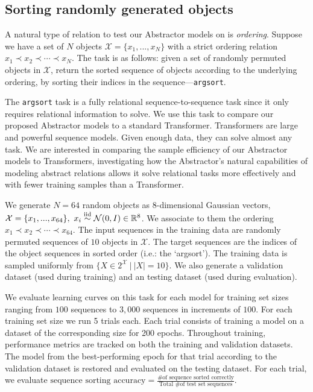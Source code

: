 \subsection{Sorting randomly generated objects}
\label{ssec:random_object_argsort}
\def\subtask#1{\noindent{\it\bfseries #1.}}


A natural type of relation to test our Abstractor models on is \textit{ordering}. Suppose we have a set of $N$ objects $\mathcal{X} = \{ x_1 , ..., x_N \}$ with a strict ordering relation $x_1 \prec x_2 \prec \cdots \prec x_N$. The task is as follows: given a set of randomly permuted objects in $\mathcal{X}$, return the sorted sequence of objects according to the underlying ordering, by sorting their indices in the sequence---\texttt{argsort}.

The \texttt{argsort} task is a fully relational sequence-to-sequence task since it only requires relational information to solve. We use this task to compare our proposed Abstractor models to a standard Transformer. Transformers are large and powerful sequence models. Given enough data, they can solve almost any task. We are interested in comparing the sample efficiency of our Abstractor models to Transformers, investigating how the Abstractor's natural capabilities of modeling abstract relations allows it solve relational tasks more effectively and with fewer training samples than a Transformer.

\subtask{Random object sorting task} We generate $N=64$ random objects as 8-dimensional Gaussian vectors, $\mathcal{X} = \{ x_1 , ..., x_{64} \}, \ x_i \overset{\mathrm{iid}}{\sim} \mathcal{N}(0, I) \in \mathbb{R}^8$. We associate to them the ordering $x_1 \prec x_2 \prec \cdots \prec x_{64}$. The input sequences in the training data are randomly permuted sequences of $10$ objects in $\mathcal{X}$. The target sequences are the indices of the object sequences in sorted order (i.e.: the `argsort'). The training data is sampled uniformly from $\{ X \in 2^\mathcal{X} \ \vert \ |X| = 10\}$. We also generate a validation dataset (used during training) and an testing dataset (used during evaluation).

\subtask{Evaluation} We evaluate learning curves on this task for each model for training set sizes ranging from $100$ sequences to $3,000$ sequences in increments of $100$. For each training set size we run 5 trials each. Each trial consists of training a model on a dataset of the corresponding size for 200 epochs. Throughout training, performance metrics are tracked on both the training and validation datasets. The model from the best-performing epoch for that trial according to the validation dataset is restored and evaluated on the testing dataset. For each trial, we evaluate $\text{sequence sorting accuracy} = \frac{\text{\# of sequence sorted correctly}}{\text{Total \# of test set sequences}}$.

